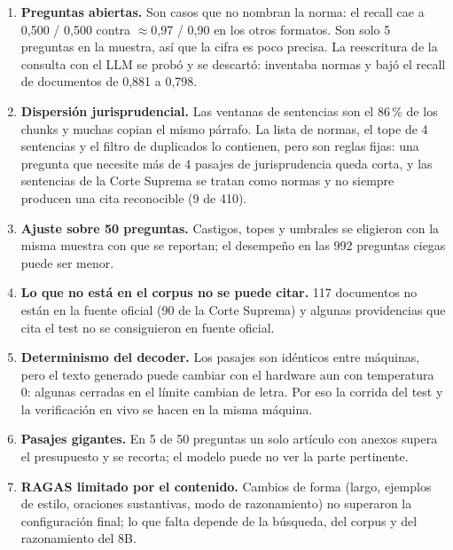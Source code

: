 \documentclass[10pt,twocolumn,letterpaper]{article}
\begin{document}
\begin{enumerate}
\item \textbf{Preguntas abiertas.} Son casos que no nombran la norma: el recall cae a
0,500 / 0,500 contra $\approx$0,97 / 0,90 en los otros formatos. Son solo 5 preguntas en
la muestra, así que la cifra es poco precisa. La reescritura de la consulta con el LLM
se probó y se descartó: inventaba normas y bajó el recall de documentos de 0,881 a 0,798.
\item \textbf{Dispersión jurisprudencial.} Las ventanas de sentencias son el 86\,\% de
los chunks y muchas copian el mismo párrafo. La lista de normas, el tope de 4 sentencias
y el filtro de duplicados lo contienen, pero son reglas fijas: una pregunta que necesite
más de 4 pasajes de jurisprudencia queda corta, y las sentencias de la Corte Suprema se
tratan como normas y no siempre producen una cita reconocible (9 de 410).
\item \textbf{Ajuste sobre 50 preguntas.} Castigos, topes y umbrales se eligieron con la
misma muestra con que se reportan; el desempeño en las 992 preguntas ciegas puede ser
menor.
\item \textbf{Lo que no está en el corpus no se puede citar.} 117 documentos no están
en la fuente oficial (90 de la Corte Suprema) y algunas providencias que cita el test no
se consiguieron en fuente oficial.
\item \textbf{Determinismo del decoder.} Los pasajes son idénticos entre máquinas, pero
el texto generado puede cambiar con el hardware aun con temperatura 0: algunas cerradas
en el límite cambian de letra. Por eso la corrida del test y la verificación en vivo se
hacen en la misma máquina.
\item \textbf{Pasajes gigantes.} En 5 de 50 preguntas un solo artículo con anexos
supera el presupuesto y se recorta; el modelo puede no ver la parte pertinente.
\item \textbf{RAGAS limitado por el contenido.} Cambios de forma (largo, ejemplos de
estilo, oraciones sustantivas, modo de razonamiento) no superaron la configuración
final; lo que falta depende de la búsqueda, del corpus y del razonamiento del 8B.
\end{enumerate}
\end{document}
